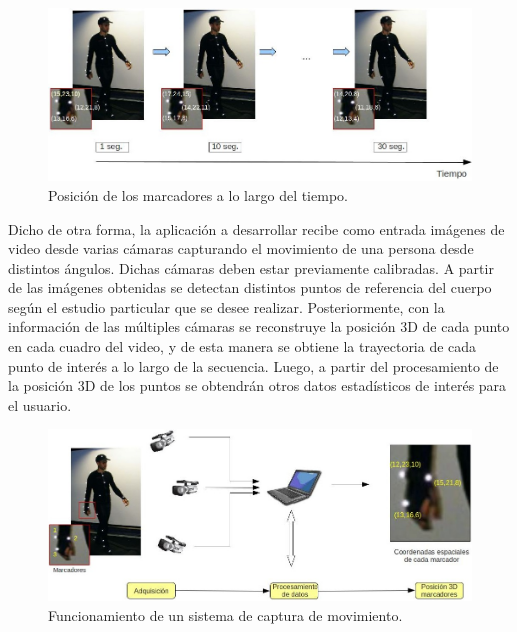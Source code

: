 \begin{figure}[H]
\begin{center}
\includegraphics[scale=0.4]{img/Sistema_completo/diagrama_abuelas_2.jpg}
\end{center}
\caption{Posición de los marcadores a lo largo del tiempo.}
\label{abuela2}
\end{figure}

Dicho de otra forma, la aplicación a desarrollar recibe como entrada imágenes de video desde varias cámaras capturando el movimiento de una persona desde distintos ángulos. Dichas cámaras deben estar previamente calibradas. A partir de las imágenes obtenidas se detectan distintos puntos de referencia del cuerpo según el estudio particular que se desee realizar. Posteriormente, con la información de las múltiples cámaras se reconstruye la posición 3D de cada punto en cada cuadro del video, y de esta manera se obtiene la trayectoria de cada punto de interés a lo largo de la secuencia. Luego, a partir del procesamiento de la posición 3D de los puntos se obtendrán otros datos estadísticos de interés para el usuario.

\begin{figure}[H]
\begin{center}
\includegraphics[scale=0.4]{img/Sistema_completo/diagrama_abuelas_1.jpg}
\end{center}
\caption{Funcionamiento de un sistema de captura de movimiento.}
\label{abuela1}
\end{figure}

